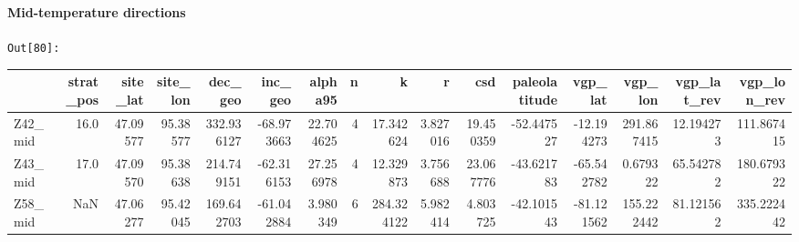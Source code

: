 \documentclass[11pt]{article}
\begin{document}
    \begin{center}
    \end{center}
    { \hspace*{\fill} \\}
    

    \begin{center}
    \end{center}
    { \hspace*{\fill} \\}
    
    \paragraph{Mid-temperature directions}\label{mid-temperature-directions}

\texttt{\color{outcolor}Out[{\color{outcolor}80}]:}
    
    \begin{sidewaystable}
    {\tiny\begin{tabular}{lrrrrrrrrrrrrrrr}
\toprule
{} &  strat\_pos &  site\_lat &  site\_lon &     dec\_geo &    inc\_geo &    alpha95 &  n &           k &         r &        csd &  paleolatitude &    vgp\_lat &     vgp\_lon &  vgp\_lat\_rev &  vgp\_lon\_rev \\
\midrule
Z42\_mid &       16.0 &  47.09577 &  95.38577 &  332.936127 & -68.973663 &  22.704625 &  4 &   17.342624 &  3.827016 &  19.450359 &     -52.447527 & -12.194273 &  291.867415 &    12.194273 &   111.867415 \\
Z43\_mid &       17.0 &  47.09570 &  95.38638 &  214.749151 & -62.316153 &  27.256978 &  4 &   12.329873 &  3.756688 &  23.067776 &     -43.621783 & -65.542782 &    0.679322 &    65.542782 &   180.679322 \\
Z58\_mid &        NaN &  47.06277 &  95.42045 &  169.642703 & -61.042884 &   3.980349 &  6 &  284.324122 &  5.982414 &   4.803725 &     -42.101543 & -81.121562 &  155.222442 &    81.121562 &   335.222442 \\
\bottomrule
\end{tabular}}
\end{sidewaystable}
    


    \begin{center}
    \end{center}
    { \hspace*{\fill} \\}
    
\end{document}
